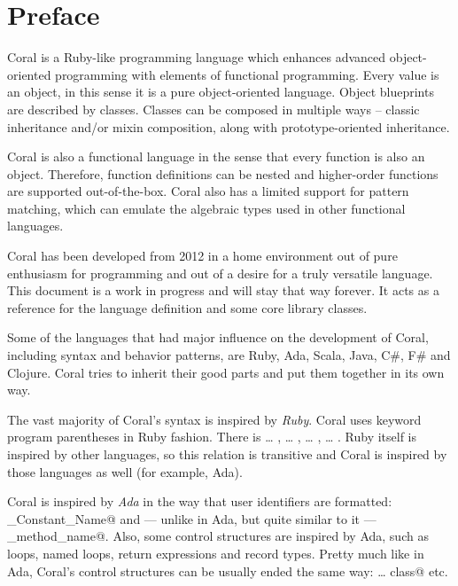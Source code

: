 
\section*{Preface}

Coral is a Ruby-like programming language which enhances advanced object-oriented programming with elements of functional programming. Every value is an object, in this sense it is a pure object-oriented language. Object blueprints are described by classes. Classes can be composed in multiple ways – classic inheritance and/or mixin composition, along with prototype-oriented inheritance.

Coral is also a functional language in the sense that every function is also an object. Therefore, function definitions can be nested and higher-order functions are supported out-of-the-box. Coral also has a limited support for pattern matching, which can emulate the algebraic types used in other functional languages.

Coral has been developed from 2012 in a home environment out of pure enthusiasm for programming and out of a desire for a truly versatile language. This document is a work in progress and will stay that way forever. It acts as a reference for the language definition and some core library classes.

Some of the languages that had major influence on the development of Coral, including syntax and behavior patterns, are Ruby, Ada, Scala, Java, C\#, F\# and Clojure. Coral tries to inherit their good parts and put them together in its own way.

The vast majority of Coral's syntax is inspired by \emph{Ruby}. Coral uses keyword program parentheses in Ruby fashion. There is \lstinline@class@ … \lstinline@end@, \lstinline@def@ … \lstinline@end@, \lstinline@do@ … \lstinline@end@, \lstinline@loop@ … \lstinline@end@. Ruby itself is inspired by other languages, so this relation is transitive and Coral is inspired by those languages as well (for example, Ada). 

Coral is inspired by \emph{Ada} in the way that user identifiers are formatted: \lstinline@Some_Constant_Name@ and — unlike in Ada, but quite similar to it — \lstinline@some_method_name@. Also, some control structures are inspired by Ada, such as loops, named loops, return expressions and record types. Pretty much like in Ada, Coral's control structures can be usually ended the same way: \lstinline@class@ … \lstinline@end class@ etc. 

